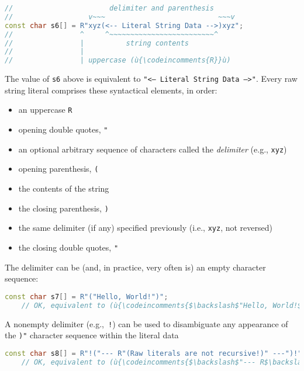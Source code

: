 \begin{lstlisting}[language=C++]
//                       delimiter and parenthesis
//                  v~~~                           ~~~v
const char s6[] = R"xyz(<-- Literal String Data -->)xyz";
//                ^     ^~~~~~~~~~~~~~~~~~~~~~~~~~^
//                |          string contents
//                |
//                | uppercase (ù{\codeincomments{R}}ù)
\end{lstlisting}
    
\noindent The value of \texttt{s6} above is equivalent to
\texttt{"<--}~\texttt{Literal}~\texttt{String}~\texttt{Data}~\texttt{-->"}.
Every raw string literal comprises these syntactical elements, in order:
\begin{itemize}
\item{an uppercase \texttt{R}}
\item{opening double quotes, \texttt{"}} 
\item{an optional arbitrary sequence of characters called the \emph{delimiter} (e.g., \texttt{xyz})}
\item{opening parenthesis, \texttt{(}}
\item{the contents of the string}
\item{the closing parenthesis, \texttt{)}}
\item{the same delimiter (if any) specified previously (i.e., \texttt{xyz}, not reversed)} 
\item{the closing double quotes, \texttt{"}}
\end{itemize}

The delimiter can be (and, in practice, very often is) an empty character
sequence:

\begin{lstlisting}[language=C++]
const char s7[] = R"("Hello, World!")";
    // OK, equivalent to (ù{\codeincomments{$\backslash$"Hello, World!$\backslash$"}}ù)
\end{lstlisting}
    
\noindent A nonempty delimiter (e.g.,~\texttt{!}) can be used to disambiguate any
appearance of the \texttt{)"} character sequence within the literal data

\begin{lstlisting}[language=C++]
const char s8[] = R"!("--- R"(Raw literals are not recursive!)" ---")!";
    // OK, equivalent to (ù{\codeincomments{$\backslash$"--- R$\backslash$"(Raw literals are not recursive!)$\backslash$" ---$\backslash$"}}ù)
\end{lstlisting}
    
